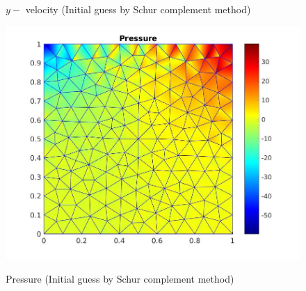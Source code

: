 \documentclass[a4paper]{book}
\begin{document}
\begin{figure}
  \begin{minipage}[c]{0.3\textwidth}
    \caption{$y-$ velocity (Initial guess by Schur complement method)}
  \label{y_vel_navier_stoke_schur_lid}
  \end{minipage}
  \begin{minipage}[c]{0.67\textwidth}
    \includegraphics[width=\textwidth]{lid_newton_pressure_schur.jpg}
  \end{minipage}\hfill
  \begin{minipage}[c]{0.3\textwidth}
    \caption{Pressure (Initial guess by Schur complement method)}
  \label{pressure_navier_stoke_schur_lid}
  \end{minipage}
\caption{\label{lid_driven_cavity_n_s_schur}}
\end{figure}
\end{document}
